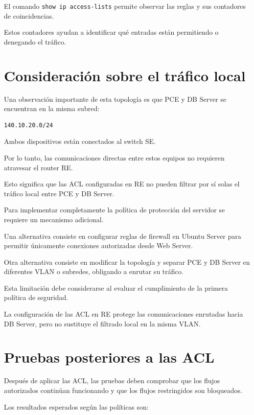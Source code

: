 \documentclass[12pt,a4paper]{article}
\begin{document}
El comando \texttt{show ip access-lists}
permite observar las reglas
y sus contadores de coincidencias.

Estos contadores ayudan
a identificar qué entradas
están permitiendo o denegando
el tráfico.

\section{Consideración sobre el tráfico local}

Una observación importante
de esta topología es que
PCE y DB Server se encuentran
en la misma subred:

\begin{lstlisting}
140.10.20.0/24
\end{lstlisting}

Ambos dispositivos están
conectados al switch SE.

Por lo tanto, las comunicaciones
directas entre estos equipos
no requieren atravesar
el router RE.

Esto significa que
las ACL configuradas
en RE no pueden filtrar
por sí solas el tráfico
local entre PCE y DB Server.

Para implementar completamente
la política de protección
del servidor se requiere
un mecanismo adicional.

Una alternativa consiste
en configurar reglas de firewall
en Ubuntu Server para permitir
únicamente conexiones autorizadas
desde Web Server.

Otra alternativa consiste
en modificar la topología
y separar PCE y DB Server
en diferentes VLAN o subredes,
obligando a enrutar su tráfico.

Esta limitación debe
considerarse al evaluar
el cumplimiento de la
primera política de seguridad.

La configuración de las ACL
en RE protege las comunicaciones
enrutadas hacia DB Server,
pero no sustituye el filtrado
local en la misma VLAN.

\section{Pruebas posteriores a las ACL}

Después de aplicar las ACL,
las pruebas deben comprobar
que los flujos autorizados
continúan funcionando y
que los flujos restringidos
son bloqueados.

Los resultados esperados
según las políticas son:
\end{document}
